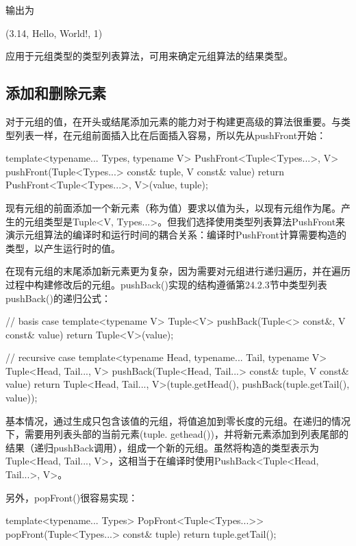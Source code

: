 输出为

\begin{shell}
(3.14, Hello, World!, 1)
\end{shell}

应用于元组类型的类型列表算法，可用来确定元组算法的结果类型。

\subsection{添加和删除元素}

对于元组的值，在开头或结尾添加元素的能力对于构建更高级的算法很重要。与类型列表一样，在元组前面插入比在后面插入容易，所以先从pushFront开始：

\begin{cpp}
template<typename... Types, typename V>
PushFront<Tuple<Types...>, V>
pushFront(Tuple<Types...> const& tuple, V const& value) {
	return PushFront<Tuple<Types...>, V>(value, tuple);
}
\end{cpp}

现有元组的前面添加一个新元素（称为值）要求以值为头，以现有元组作为尾。产生的元组类型是Tuple<V, Types...>。但我们选择使用类型列表算法PushFront来演示元组算法的编译时和运行时间的耦合关系：编译时PushFront计算需要构造的类型，以产生运行时的值。

在现有元组的末尾添加新元素更为复杂，因为需要对元组进行递归遍历，并在遍历过程中构建修改后的元组。pushBack()实现的结构遵循第24.2.3节中类型列表pushBack()的递归公式：

\begin{cpp}
// basis case
template<typename V>
Tuple<V> pushBack(Tuple<> const&, V const& value) {
	return Tuple<V>(value);
}

// recursive case
template<typename Head, typename... Tail, typename V>
Tuple<Head, Tail..., V>
pushBack(Tuple<Head, Tail...> const& tuple, V const& value) {
	return Tuple<Head, Tail..., V>(tuple.getHead(),
	pushBack(tuple.getTail(), value));
}
\end{cpp}

基本情况，通过生成只包含该值的元组，将值追加到零长度的元组。在递归的情况下，需要用列表头部的当前元素(tuple. gethead())，并将新元素添加到列表尾部的结果（递归pushBack调用），组成一个新的元组。虽然将构造的类型表示为Tuple<Head, Tail..., V>，这相当于在编译时使用PushBack<Tuple<Head, Tail...>, V>。

另外，popFront()很容易实现：

\begin{cpp}
template<typename... Types>
PopFront<Tuple<Types...>>
popFront(Tuple<Types...> const& tuple) {
	return tuple.getTail();
}
\end{cpp}

